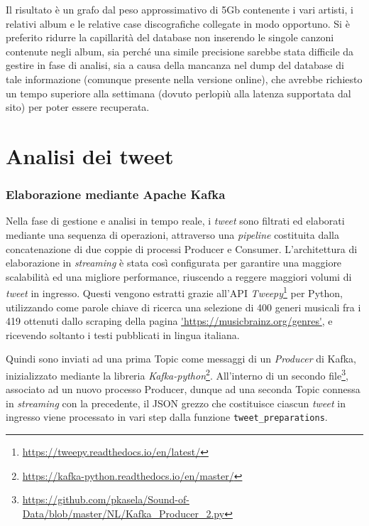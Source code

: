 \documentclass[12pt, a4paper, twocolumn]{article} %
\begin{document}
Il risultato è un grafo dal peso approssimativo di 5Gb contenente i vari artisti, i relativi album e le relative case discografiche collegate in modo opportuno.
Si è preferito ridurre la capillarità del database non inserendo le singole canzoni contenute negli album, sia perché una simile precisione sarebbe stata difficile da gestire in fase di analisi, sia a causa della mancanza nel dump del database di tale informazione (comunque presente nella versione online), che avrebbe richiesto un tempo superiore alla settimana (dovuto perlopiù alla latenza supportata dal sito) per poter essere recuperata.


\hfill
\newpage
\part{Analisi dei tweet}
\section{Elaborazione mediante Apache Kafka}
Nella fase di gestione e analisi in tempo reale, i \textit{tweet} sono filtrati ed elaborati mediante una sequenza di operazioni, attraverso una \textit{pipeline} costituita dalla concatenazione di due coppie di processi Producer e Consumer.
L'architettura di elaborazione in \textit{streaming} è stata così configurata per garantire una maggiore scalabilità ed una migliore performance, riuscendo a reggere maggiori volumi di \textit{tweet} in ingresso.
Questi vengono estratti grazie all'API \textit{Tweepy}\footnote{\url{https://tweepy.readthedocs.io/en/latest/}} per Python, utilizzando come parole chiave di ricerca una selezione di 400 generi musicali fra i 419 ottenuti dallo scraping della pagina \url{'https://musicbrainz.org/genres'}, e ricevendo soltanto i testi pubblicati in lingua italiana.

Quindi sono inviati ad una prima Topic come messaggi di un \textit{Producer} di Kafka, inizializzato mediante la libreria \textit{Kafka-python}\footnote{\url{https://kafka-python.readthedocs.io/en/master/}}. 
All'interno di un secondo file\footnote{\url{https://github.com/pkasela/Sound-of-Data/blob/master/NL/Kafka_Producer_2.py}}, associato ad un nuovo processo Producer, dunque ad una seconda Topic connessa in \textit{streaming} con la precedente, il JSON grezzo che costituisce ciascun \textit{tweet} in ingresso viene processato in vari step dalla funzione \verb|tweet_preparations|.
\end{document}
